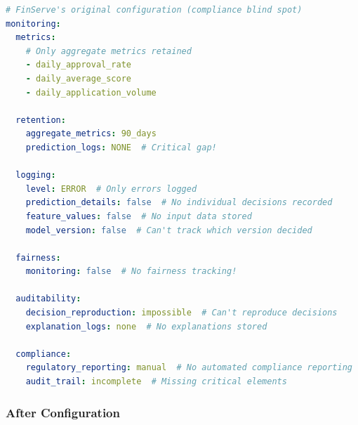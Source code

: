 \begin{lstlisting}[language=yaml, caption={Non-Compliant Monitoring Configuration}]
# FinServe's original configuration (compliance blind spot)
monitoring:
  metrics:
    # Only aggregate metrics retained
    - daily_approval_rate
    - daily_average_score
    - daily_application_volume

  retention:
    aggregate_metrics: 90_days
    prediction_logs: NONE  # Critical gap!

  logging:
    level: ERROR  # Only errors logged
    prediction_details: false  # No individual decisions recorded
    feature_values: false  # No input data stored
    model_version: false  # Can't track which version decided

  fairness:
    monitoring: false  # No fairness tracking!

  auditability:
    decision_reproduction: impossible  # Can't reproduce decisions
    explanation_logs: none  # No explanations stored

  compliance:
    regulatory_reporting: manual  # No automated compliance reporting
    audit_trail: incomplete  # Missing critical elements
\end{lstlisting}

\subsubsection{After Configuration}

